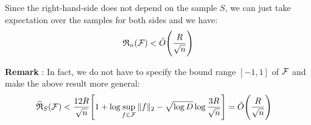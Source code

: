 \begin{proof*}
    \noindent Since the right-hand-side does not depend on the sample $S$, we can just take expectation over the samples for both sides and we have:
    \begin{align*}
        \mathfrak{R}_n(\mathcal{F}) < \tilde O\Bigg(  \frac{R}{\sqrt n}  \Bigg)
    \end{align*}

    \noindent \textbf{Remark} : In fact, we do not have to specify the bound range $[-1, 1]$ of $\mathcal{F}$ and make the above result more general:
    \begin{align*}
        \widehat{\mathfrak{R}}_S(\mathcal{F}) &< \frac{12R}{\sqrt n}\Bigg[ 
            1 + \log\sup_{f\in\mathcal{F}}\|f\|_2 - \sqrt{\log D}\log\frac{3R}{\sqrt{n}}
         \Bigg] = \tilde O\Bigg(  \frac{R}{\sqrt n}  \Bigg)
    \end{align*}
\end{proof*}

